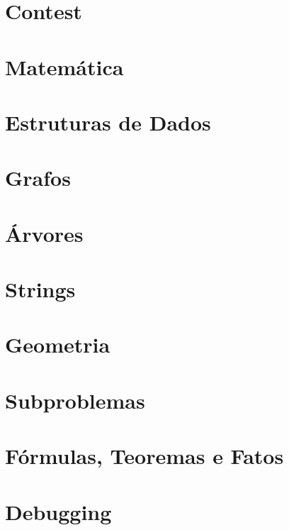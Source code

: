 

\begin{multicols*}{\notebookcolumns}

\maketitle
\ifextended
\tableofcontents
\newpage
\fi
\notebookbodyfontsize

\section{Contest}


\section{Matemática}


\section{Estruturas de Dados}


\section{Grafos}


\section{Árvores}


\section{Strings}


\section{Geometria}


\ifextended
\section{Subproblemas}

\fi

\appendix
\section{F\'ormulas, Teoremas e Fatos}

\section{Debugging}


\end{multicols*}


